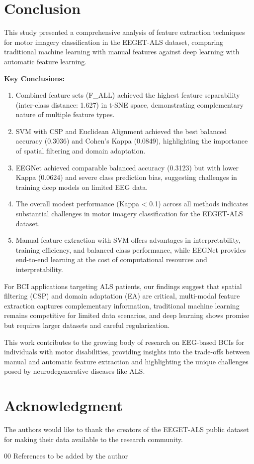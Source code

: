 \documentclass[conference]{IEEEtran}
\begin{document}
\section{Conclusion}

This study presented a comprehensive analysis of feature extraction techniques for motor imagery classification in the EEGET-ALS dataset, comparing traditional machine learning with manual features against deep learning with automatic feature learning.

\textbf{Key Conclusions:}
\begin{enumerate}
    \item Combined feature sets (F\_ALL) achieved the highest feature separability (inter-class distance: 1.627) in t-SNE space, demonstrating complementary nature of multiple feature types.
    
    \item SVM with CSP and Euclidean Alignment achieved the best balanced accuracy (0.3036) and Cohen's Kappa (0.0849), highlighting the importance of spatial filtering and domain adaptation.
    
    \item EEGNet achieved comparable balanced accuracy (0.3123) but with lower Kappa (0.0624) and severe class prediction bias, suggesting challenges in training deep models on limited EEG data.
    
    \item The overall modest performance (Kappa < 0.1) across all methods indicates substantial challenges in motor imagery classification for the EEGET-ALS dataset.
    
    \item Manual feature extraction with SVM offers advantages in interpretability, training efficiency, and balanced class performance, while EEGNet provides end-to-end learning at the cost of computational resources and interpretability.
\end{enumerate}

For BCI applications targeting ALS patients, our findings suggest that spatial filtering (CSP) and domain adaptation (EA) are critical, multi-modal feature extraction captures complementary information, traditional machine learning remains competitive for limited data scenarios, and deep learning shows promise but requires larger datasets and careful regularization.

This work contributes to the growing body of research on EEG-based BCIs for individuals with motor disabilities, providing insights into the trade-offs between manual and automatic feature extraction and highlighting the unique challenges posed by neurodegenerative diseases like ALS.

\section*{Acknowledgment}

The authors would like to thank the creators of the EEGET-ALS public dataset for making their data available to the research community.

\begin{thebibliography}{00}
 References to be added by the author
\end{thebibliography}
\end{document}

